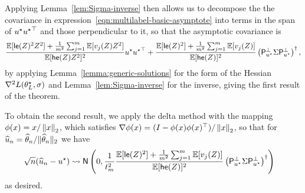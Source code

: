 Applying Lemma~\ref{lem:Sigma-inverse} then allows us to decompose the the
covariance in expression~\eqref{eqn:multilabel-basic-asymptote} into
terms in the span of $u^\star {u^\star}^\top$ and those perpendicular to
it, so that the asymptotic covariance is
\begin{align*}
	\frac{\mathbb{E}[\mathsf{le}(Z)^2 Z^2] + \frac{1}{m^2}
		\sum_{j = 1}^m \mathbb{E}[v_j(Z) Z^2]}{
		\mathbb{E}[\mathsf{he}(Z) Z^2]^2} u^\star {u^\star}^\top
	+ \frac{\mathbb{E}[\mathsf{le}(Z)^2] + \frac{1}{m^2}
		\sum_{j = 1}^m \mathbb{E}[v_j(Z)]}{\mathbb{E}[\mathsf{he}(Z)]^2}
	\left({\mathsf{P}_{u^\star}^\perp \Sigma \mathsf{P}_{u^\star}^\perp}\right)^\dagger,
\end{align*}
by applying Lemma~\ref{lemma:generic-solutions} for the form of the Hessian
$\nabla^2 L(\theta_L^\star, \sigma)$ and Lemma~\ref{lem:Sigma-inverse} for the
inverse, giving the first result of the theorem.

To obtain the second result, we apply the delta method with
the mapping $\phi(x) = x / \left\|{x}\right\|_2$, which satisfies
$\nabla \phi(x) = (I - \phi(x) \phi(x)^\top) / \left\|{x}\right\|_2$,
so that for $\widehat{u}_n = \widehat{\theta}_n / \|{\widehat{\theta}_n}\|_2$ we have
\begin{align*}
  \sqrt{n}(\widehat{u}_n - u^\star)
  & \rightsquigarrow
  \mathsf{N}\left(0, \frac{1}{t_m^2}
  \frac{\mathbb{E}[\mathsf{le}(Z)^2] + \frac{1}{m^2}
    \sum_{j = 1}^m \mathbb{E}[v_j(Z)]}{\mathbb{E}[\mathsf{he}(Z)]^2}
  \left({\mathsf{P}_{u^\star}^\perp \Sigma \mathsf{P}_{u^\star}^\perp}\right)^\dagger
  \right)
\end{align*}
as desired.
